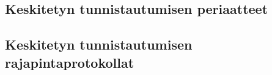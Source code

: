 
\subsection{Keskitetyn tunnistautumisen periaatteet}

\subsection{Keskitetyn tunnistautumisen rajapintaprotokollat}
